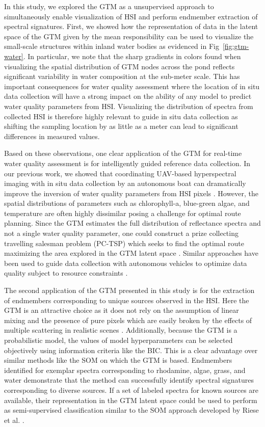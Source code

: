 \documentclass[remotesensing,article,submit,pdftex,moreauthors]{Definitions/mdpi}
\begin{document}
In this study, we explored the GTM as a unsupervised approach to simultaneously enable visualization of HSI and perform endmember extraction of spectral signatures. First, we showed how the representation of data in the latent space of the GTM given by the mean responsibility can be used to visualize the small-scale structures within inland water bodies as evidenced in Fig~\ref{fig:gtm-water}. In particular, we note that the sharp gradients in colors found when visualizing the spatial distribution of GTM nodes across the pond reflects significant variability in water composition at the sub-meter scale. This has important consequences for water quality assessment where the location of in situ data collection will have a strong impact on the ability of any model to predict water quality parameters from HSI. Visualizing the distribution of spectra from collected HSI is therefore highly relevant to guide in situ data collection as shifting the sampling location by as little as a meter can lead to significant differences in measured values.

Based on these observations, one clear application of the GTM for real-time water quality assessment is for intelligently guided reference data collection. In our previous work, we showed that coordinating UAV-based hyperspectral imaging with in situ data collection by an autonomous boat can dramatically improve the inversion of water quality parameters from HSI pixels \cite{robot-team-2}. However, the spatial distributions of parameters such as chlorophyll-a, blue-green algae, and temperature are often highly dissimilar posing a challenge for optimal route planning. Since the GTM estimates the full distribution of reflectance spectra and not a single water quality parameter, one could construct a prize collecting travelling salesman problem (PC-TSP) which seeks to find the optimal route maximizing the area explored in the GTM latent space \cite{balas2007prize}. Similar approaches have been used to guide data collection with autonomous vehicles to optimize data quality subject to resource constraints \cite{suryan2020learning}. 

The second application of the GTM presented in this study is for the extraction of endmembers corresponding to unique sources observed in the HSI. Here the GTM is an attractive choice as it does not rely on the assumption of linear mixing and the presence of pure pixels which are easily broken by the effects of multiple scattering in realistic scenes \cite{nonlinearity-in-hsi}. Additionally, because the GTM is a probabilistic model, the values of model hyperparameters can be selected objectively using information criteria like the BIC. This is a clear advantage over similar methods like the SOM on which the GTM is based. Endmembers identified for exemplar spectra corresponding to rhodamine, algae, grass, and water demonstrate that the method can successfully identify spectral signatures corresponding to diverse sources. If a set of labeled spectra for known sources are available, their representation in the GTM latent space could be used to perform as semi-supervised classification similar to the SOM approach developed by Riese et al. \cite{riese2019supervised}.
\end{document}
